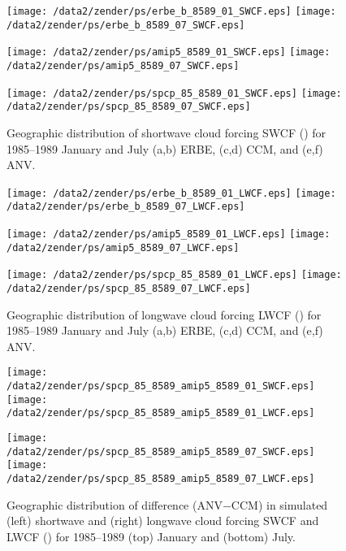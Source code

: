 \documentclass[twocolumn,final]{article}
\begin{document}
\begin{figure*}
\begin{center}
\texttt{[image: /data2/zender/ps/erbe\_b\_8589\_01\_SWCF.eps]}%
\texttt{[image: /data2/zender/ps/erbe\_b\_8589\_07\_SWCF.eps]}%

\texttt{[image: /data2/zender/ps/amip5\_8589\_01\_SWCF.eps]}%
\texttt{[image: /data2/zender/ps/amip5\_8589\_07\_SWCF.eps]}%

\texttt{[image: /data2/zender/ps/spcp\_85\_8589\_01\_SWCF.eps]}%
\texttt{[image: /data2/zender/ps/spcp\_85\_8589\_07\_SWCF.eps]}%
\end{center}
\caption[Geographic distribution of shortwave cloud forcing SWCF
for 1985--1989 January and July ERBE, CCM, and ANV]{
Geographic distribution of shortwave cloud forcing SWCF (\wxmS) for
1985--1989 January and July (a,b) ERBE, (c,d) CCM, and (e,f) ANV.  
\label{fig:8589_SWCF}}   
\end{figure*}
\clearpage

\begin{figure*}
\begin{center}
\texttt{[image: /data2/zender/ps/erbe\_b\_8589\_01\_LWCF.eps]}%
\texttt{[image: /data2/zender/ps/erbe\_b\_8589\_07\_LWCF.eps]}%

\texttt{[image: /data2/zender/ps/amip5\_8589\_01\_LWCF.eps]}%
\texttt{[image: /data2/zender/ps/amip5\_8589\_07\_LWCF.eps]}%

\texttt{[image: /data2/zender/ps/spcp\_85\_8589\_01\_LWCF.eps]}%
\texttt{[image: /data2/zender/ps/spcp\_85\_8589\_07\_LWCF.eps]}%
\end{center}
\caption[Geographic distribution of longwave cloud forcing LWCF
for 1985--1989 January and July ERBE, CCM, and ANV]{
Geographic distribution of longwave cloud forcing LWCF (\wxmS) for
1985--1989 January and July (a,b) ERBE, (c,d) CCM, and (e,f) ANV. 
\label{fig:8589_LWCF}}   
\end{figure*}
\clearpage

\begin{figure*}
\begin{center}
\texttt{[image: /data2/zender/ps/spcp\_85\_8589\_amip5\_8589\_01\_SWCF.eps]}%
\texttt{[image: /data2/zender/ps/spcp\_85\_8589\_amip5\_8589\_01\_LWCF.eps]}%

\texttt{[image: /data2/zender/ps/spcp\_85\_8589\_amip5\_8589\_07\_SWCF.eps]}%
\texttt{[image: /data2/zender/ps/spcp\_85\_8589\_amip5\_8589\_07\_LWCF.eps]}%
\end{center}
\caption[Geographic distribution of difference (ANV$-$CCM) in
simulated shortwave and longwave cloud forcing between ANV and CCM for
January and July 1985--1989]{ 
Geographic distribution of difference (ANV$-$CCM) in simulated
(left) shortwave and (right) longwave cloud forcing SWCF and LWCF
(\wxmS) for 1985--1989 (top) January and (bottom) July. 
\label{fig:spcp_85_8589_amip5_8589_CF}}
\end{figure*}
\clearpage
\end{document}
